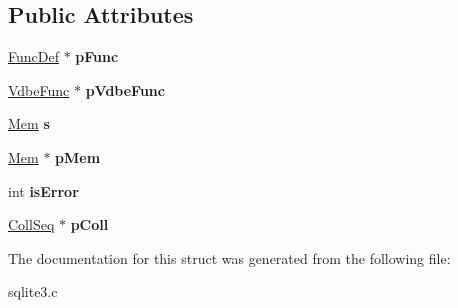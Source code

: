 \subsection*{Public Attributes}
\begin{DoxyCompactItemize}
\item 
\hypertarget{structsqlite3__context_af4215c87be2c0cb10868f623a552a2aa}{\hyperlink{struct_func_def}{Func\-Def} $\ast$ {\bfseries p\-Func}}\label{structsqlite3__context_af4215c87be2c0cb10868f623a552a2aa}

\item 
\hypertarget{structsqlite3__context_af35405f4f62cfc0b81bb2eb6c82b2363}{\hyperlink{struct_vdbe_func}{Vdbe\-Func} $\ast$ {\bfseries p\-Vdbe\-Func}}\label{structsqlite3__context_af35405f4f62cfc0b81bb2eb6c82b2363}

\item 
\hypertarget{structsqlite3__context_a53d44518a1f7f57ce5a2d73b6e8d2c14}{\hyperlink{struct_mem}{Mem} {\bfseries s}}\label{structsqlite3__context_a53d44518a1f7f57ce5a2d73b6e8d2c14}

\item 
\hypertarget{structsqlite3__context_a7b84aa5920329cb0eb943832175b48b5}{\hyperlink{struct_mem}{Mem} $\ast$ {\bfseries p\-Mem}}\label{structsqlite3__context_a7b84aa5920329cb0eb943832175b48b5}

\item 
\hypertarget{structsqlite3__context_ae4351b8da8c6d2676074612c1b8d4af5}{int {\bfseries is\-Error}}\label{structsqlite3__context_ae4351b8da8c6d2676074612c1b8d4af5}

\item 
\hypertarget{structsqlite3__context_a4e4b12fb65814515fdb967559693f816}{\hyperlink{struct_coll_seq}{Coll\-Seq} $\ast$ {\bfseries p\-Coll}}\label{structsqlite3__context_a4e4b12fb65814515fdb967559693f816}

\end{DoxyCompactItemize}


The documentation for this struct was generated from the following file\-:\begin{DoxyCompactItemize}
\item 
sqlite3.\-c\end{DoxyCompactItemize}
